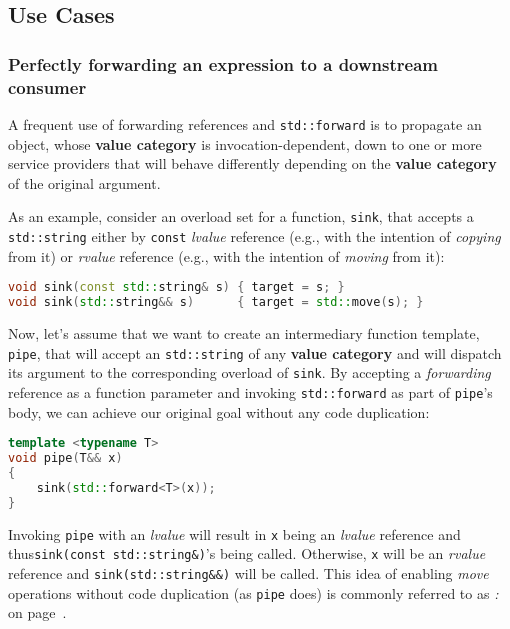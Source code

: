 \subsection[Use Cases]{Use Cases}\label{use-cases-forwardingref}

\subsubsection[Perfectly forwarding an expression to a downstream consumer]{Perfectly forwarding an expression to a downstream consumer}\label{perfectly-forwarding-an-expression-to-a-downstream-consumer}

A frequent use of forwarding references and \texttt{std::forward} is to
propagate an object, whose \textbf{value category} is
invocation-dependent, down to one or more service providers that will
behave differently depending on the \textbf{value category} of the
original argument.

As an example, consider an overload set for a function, \texttt{sink},
that accepts a \texttt{std::string} either by \texttt{const}
\emph{lvalue} reference (e.g., with the intention of \textit{copying} from it) or
\emph{rvalue} reference (e.g., with the intention of \textit{moving} from it):

\begin{lstlisting}[language=C++]
void sink(const std::string& s) { target = s; }
void sink(std::string&& s)      { target = std::move(s); }
\end{lstlisting}

\noindent Now, let's assume that we want to create an intermediary function
template, \texttt{pipe}, that will accept an \texttt{std::string} of any
\textbf{value category} and will dispatch its argument to the
corresponding overload of \texttt{sink}. By accepting a
\emph{forwarding} reference as a function parameter and invoking
\texttt{std::forward} as part of \texttt{pipe}'s body, we can achieve
our original goal without any code duplication:

\begin{lstlisting}[language=C++]
template <typename T>
void pipe(T&& x)
{
    sink(std::forward<T>(x));
}
\end{lstlisting}

\noindent Invoking \texttt{pipe} with an \emph{lvalue} will result in \texttt{x}
being an \emph{lvalue} reference and thus\linebreak[4]%
\mbox{\texttt{sink(const}~\texttt{std::string\&)}'s} being called. Otherwise,
\texttt{x} will be an \emph{rvalue} reference and
\texttt{sink(std::string\&\&)} will be called. This idea of enabling
\emph{move} operations without code duplication (as \texttt{pipe} does)
is commonly referred to as \textit{: } on page~\pageref{perfect-forwarding-for-generic-factory-functions}.

